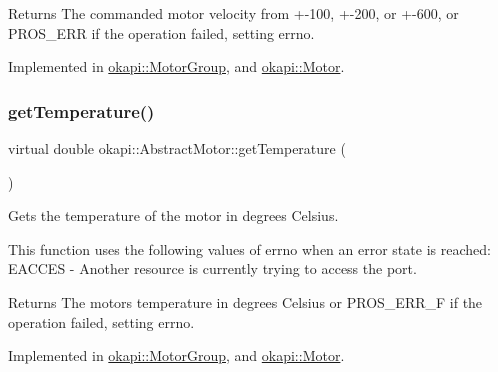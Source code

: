 \begin{DoxyReturn}{Returns}
The commanded motor velocity from +-\/100, +-\/200, or +-\/600, or P\+R\+O\+S\+\_\+\+E\+RR if the operation failed, setting errno. 
\end{DoxyReturn}


Implemented in \mbox{\hyperlink{classokapi_1_1MotorGroup_a841736ae664104fb38ffff33ef763394}{okapi\+::\+Motor\+Group}}, and \mbox{\hyperlink{classokapi_1_1Motor_aee4697f4e1f39bc0206062d0247caf47}{okapi\+::\+Motor}}.

\mbox{\label{classokapi_1_1AbstractMotor_a96ef2dc7eeb1ac23713e3e37af9e95f2}} 
\subsubsection{\texorpdfstring{getTemperature()}{getTemperature()}}
{\footnotesize\ttfamily virtual double okapi\+::\+Abstract\+Motor\+::get\+Temperature (\begin{DoxyParamCaption}{ }\end{DoxyParamCaption})\hspace{0.3cm}{\ttfamily [pure virtual]}}

Gets the temperature of the motor in degrees Celsius.

This function uses the following values of errno when an error state is reached\+: E\+A\+C\+C\+ES -\/ Another resource is currently trying to access the port.

\begin{DoxyReturn}{Returns}
The motor\textquotesingle{}s temperature in degrees Celsius or P\+R\+O\+S\+\_\+\+E\+R\+R\+\_\+F if the operation failed, setting errno. 
\end{DoxyReturn}


Implemented in \mbox{\hyperlink{classokapi_1_1MotorGroup_acba91d770dbc7e38f59070e8d5957d6d}{okapi\+::\+Motor\+Group}}, and \mbox{\hyperlink{classokapi_1_1Motor_ab5b9208b001c1ab49f8c058eff58e5b3}{okapi\+::\+Motor}}.

\mbox{\label{classokapi_1_1AbstractMotor_a955818baa689b279b36dda6a74f15d4e}} 
